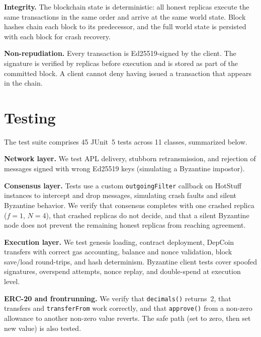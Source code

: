 \documentclass{llncs}
\begin{document}
\textbf{Integrity.} The blockchain state is deterministic: all honest replicas execute the same transactions in the same order and arrive at the same world state. Block hashes chain each block to its predecessor, and the full world state is persisted with each block for crash recovery.

\textbf{Non-repudiation.} Every transaction is Ed25519-signed by the client. The signature is verified by replicas before execution and is stored as part of the committed block. A client cannot deny having issued a transaction that appears in the chain.

\section{Testing}

The test suite comprises 45 JUnit~5 tests across 11 classes, summarized below.

\textbf{Network layer.} We test APL delivery, stubborn retransmission, and rejection of messages signed with wrong Ed25519 keys (simulating a Byzantine impostor).

\textbf{Consensus layer.} Tests use a custom \texttt{outgoingFilter} callback on HotStuff instances to intercept and drop messages, simulating crash faults and silent Byzantine behavior. We verify that consensus completes with one crashed replica ($f{=}1$, $N{=}4$), that crashed replicas do not decide, and that a silent Byzantine node does not prevent the remaining honest replicas from reaching agreement.

\textbf{Execution layer.} We test genesis loading, contract deployment, DepCoin transfers with correct gas accounting, balance and nonce validation, block save/load round-trips, and hash determinism. Byzantine client tests cover spoofed signatures, overspend attempts, nonce replay, and double-spend at execution level.

\textbf{ERC-20 and frontrunning.} We verify that \texttt{decimals()} returns~2, that transfers and \texttt{transferFrom} work correctly, and that \texttt{approve()} from a non-zero allowance to another non-zero value reverts. The safe path (set to zero, then set new value) is also tested.
\end{document}
